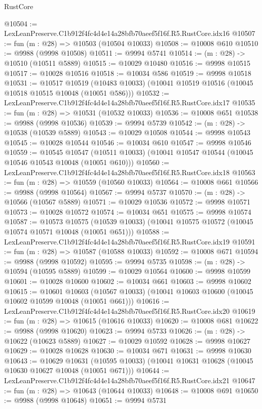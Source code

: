 \begin{lexlean}{RustCore}
\begin{coremodule}
@10504 := LexLeanPreserve.C1b912f4fc4d4e14a28bfb70aeef5f16f.R5.RustCore.idx16
@10507 := fun (m : @28) => @10503 (@10504 @10033)
@10508 := @10008 @610
@10510 := @9988 (@9998 @10508)
@10511 := @9994 @5741
@10514 := (m : @28) -> @10510 (@10511 @5889)
@10515 := @10029 @10480
@10516 := @9998 @10515
@10517 := @10028 @10516
@10518 := @10034 @586
@10519 := @9998 @10518
@10531 := @10517
    @10519
    (@10483 @10033)
    (@10041 @10519 @10516 (@10045 @10518 @10515 @10048 (@10051 @586)))
@10532 := LexLeanPreserve.C1b912f4fc4d4e14a28bfb70aeef5f16f.R5.RustCore.idx17
@10535 := fun (m : @28) => @10531 (@10532 @10033)
@10536 := @10008 @651
@10538 := @9988 (@9998 @10536)
@10539 := @9994 @5739
@10542 := (m : @28) -> @10538 (@10539 @5889)
@10543 := @10029 @10508
@10544 := @9998 @10543
@10545 := @10028 @10544
@10546 := @10034 @610
@10547 := @9998 @10546
@10559 := @10545
    @10547
    (@10511 @10033)
    (@10041 @10547 @10544 (@10045 @10546 @10543 @10048 (@10051 @610)))
@10560 := LexLeanPreserve.C1b912f4fc4d4e14a28bfb70aeef5f16f.R5.RustCore.idx18
@10563 := fun (m : @28) => @10559 (@10560 @10033)
@10564 := @10008 @661
@10566 := @9988 (@9998 @10564)
@10567 := @9994 @5737
@10570 := (m : @28) -> @10566 (@10567 @5889)
@10571 := @10029 @10536
@10572 := @9998 @10571
@10573 := @10028 @10572
@10574 := @10034 @651
@10575 := @9998 @10574
@10587 := @10573
    @10575
    (@10539 @10033)
    (@10041 @10575 @10572 (@10045 @10574 @10571 @10048 (@10051 @651)))
@10588 := LexLeanPreserve.C1b912f4fc4d4e14a28bfb70aeef5f16f.R5.RustCore.idx19
@10591 := fun (m : @28) => @10587 (@10588 @10033)
@10592 := @10008 @671
@10594 := @9988 (@9998 @10592)
@10595 := @9994 @5735
@10598 := (m : @28) -> @10594 (@10595 @5889)
@10599 := @10029 @10564
@10600 := @9998 @10599
@10601 := @10028 @10600
@10602 := @10034 @661
@10603 := @9998 @10602
@10615 := @10601
    @10603
    (@10567 @10033)
    (@10041 @10603 @10600 (@10045 @10602 @10599 @10048 (@10051 @661)))
@10616 := LexLeanPreserve.C1b912f4fc4d4e14a28bfb70aeef5f16f.R5.RustCore.idx20
@10619 := fun (m : @28) => @10615 (@10616 @10033)
@10620 := @10008 @681
@10622 := @9988 (@9998 @10620)
@10623 := @9994 @5733
@10626 := (m : @28) -> @10622 (@10623 @5889)
@10627 := @10029 @10592
@10628 := @9998 @10627
@10629 := @10028 @10628
@10630 := @10034 @671
@10631 := @9998 @10630
@10643 := @10629
    @10631
    (@10595 @10033)
    (@10041 @10631 @10628 (@10045 @10630 @10627 @10048 (@10051 @671)))
@10644 := LexLeanPreserve.C1b912f4fc4d4e14a28bfb70aeef5f16f.R5.RustCore.idx21
@10647 := fun (m : @28) => @10643 (@10644 @10033)
@10648 := @10008 @691
@10650 := @9988 (@9998 @10648)
@10651 := @9994 @5731

\end{coremodule}
\end{lexlean}

